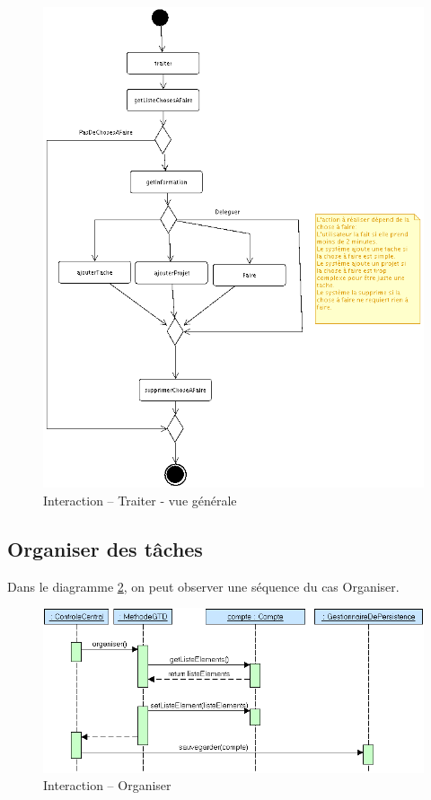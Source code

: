 \begin{figure}[!htbp]
\centering
\includegraphics[width=12cm]{images/L3/diagrammeActivite/Traiter.png}
\caption{Interaction \--- Traiter \-- vue générale}
\label{traiterActivite}
\end{figure}

\subsection{Organiser des tâches}

Dans le diagramme \ref{organizeSequence}, on peut observer une séquence du cas Organiser. 

\begin{figure}[!htbp]
\centering
\includegraphics[width=12cm]{images/L3/diagrammeSequence/organiser.png}
\caption{Interaction \--- Organiser}
\label{organizeSequence}
\end{figure}

